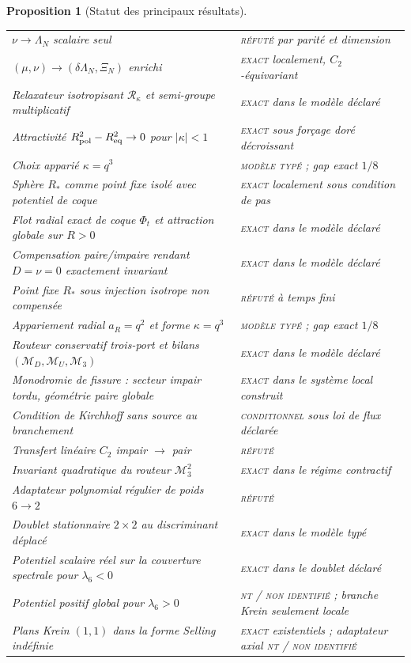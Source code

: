 \documentclass[11pt,a4paper]{article}
\newtheorem{proposition}[theorem]{Proposition}
\newcommand{\statusExact}{\textsc{exact}}
\newcommand{\statusCond}{\textsc{conditionnel}}
\newcommand{\statusTyped}{\textsc{modèle typé}}
\newcommand{\statusNT}{\textsc{nt / non identifié}}
\begin{document}
\begin{proposition}[Statut des principaux résultats]
\begin{longtable}{@{}p{}p{}@{}}
$\nu\to\Lambda_N$ scalaire seul & \textsc{réfuté} par parité et dimension\\
$(\mu,\nu)\to(\delta\Lambda_N,\Xi_N)$ enrichi & \statusExact{} localement, $C_2$-équivariant\\
Relaxateur isotropisant $\mathcal R_\kappa$ et semi-groupe multiplicatif & \statusExact{} dans le modèle déclaré\\
Attractivité $R_{\rm pol}^2-R_{\rm eq}^2\to0$ pour $|\kappa|<1$ & \statusExact{} sous forçage doré décroissant\\
Choix apparié $\kappa=q^3$ & \statusTyped{} ; gap exact $1/8$\\
Sphère $R_*$ comme point fixe isolé avec potentiel de coque & \statusExact{} localement sous condition de pas\\
Flot radial exact de coque $\Phi_t$ et attraction globale sur $R>0$ & \statusExact{} dans le modèle déclaré\\
Compensation paire/impaire rendant $D=\nu=0$ exactement invariant & \statusExact{} dans le modèle déclaré\\
Point fixe $R_*$ sous injection isotrope non compensée & \textsc{réfuté} à temps fini\\
Appariement radial $a_R=q^2$ et forme $\kappa=q^3$ & \statusTyped{} ; gap exact $1/8$\\
Routeur conservatif trois-port et bilans $(\mathcal M_D,\mathcal M_U,\mathcal M_3)$ & \statusExact{} dans le modèle déclaré\\
Monodromie de fissure : secteur impair tordu, géométrie paire globale & \statusExact{} dans le système local construit\\
Condition de Kirchhoff sans source au branchement & \statusCond{} sous loi de flux déclarée\\
Transfert linéaire $C_2$ impair $\to$ pair & \textsc{réfuté}\\
Invariant quadratique du routeur $\mathcal M_3^2$ & \statusExact{} dans le régime contractif\\
Adaptateur polynomial régulier de poids $6\to2$ & \textsc{réfuté}\\
Doublet stationnaire $2\times2$ au discriminant déplacé & \statusExact{} dans le modèle typé\\
Potentiel scalaire réel sur la couverture spectrale pour $\lambda_6<0$ & \statusExact{} dans le doublet déclaré\\
Potentiel positif global pour $\lambda_6>0$ & \statusNT{} ; branche Krein seulement locale\\
Plans Krein $(1,1)$ dans la forme Selling indéfinie & \statusExact{} existentiels ; adaptateur axial \statusNT{}\\

\end{longtable}
\end{proposition}
\end{document}
